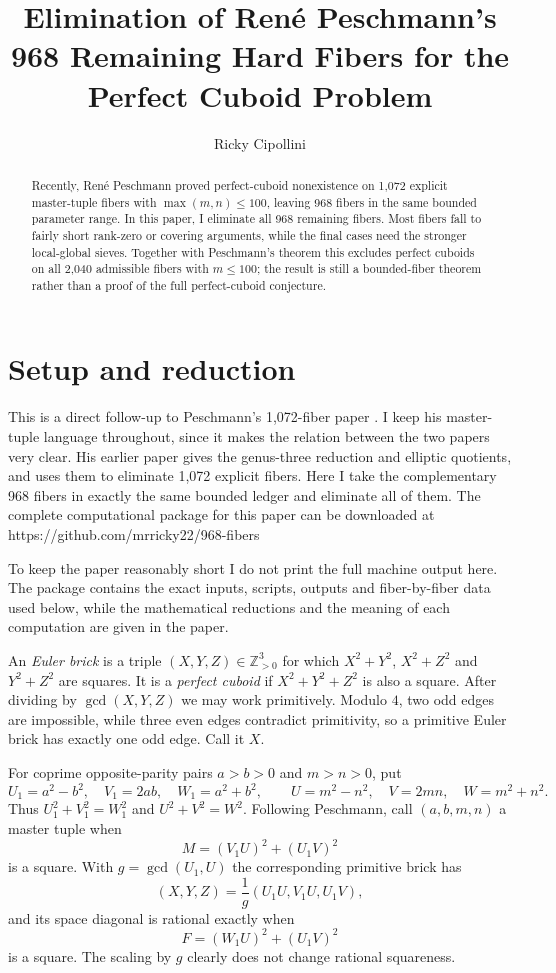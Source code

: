 \documentclass[11pt,a4paper]{amsart}
\title{Elimination of Ren\'e Peschmann's 968 Remaining Hard Fibers for the Perfect Cuboid Problem}
\author{Ricky Cipollini}
\newcommand{\Z}{\mathbb Z}
\begin{document}
\begin{abstract}
Recently, Ren\'e Peschmann proved perfect-cuboid nonexistence on 1,072 explicit master-tuple fibers with $\max(m,n)\le100$, leaving 968 fibers in the same bounded parameter range. In this paper, I eliminate all 968 remaining fibers. Most fibers fall to fairly short rank-zero or covering arguments, while the final cases need the stronger local-global sieves. Together with Peschmann's theorem this excludes perfect cuboids on all 2,040 admissible fibers with $m\le100$; the result is still a bounded-fiber theorem rather than a proof of the full perfect-cuboid conjecture.
\end{abstract}

\maketitle
{}
\section{Setup and reduction}

This is a direct follow-up to Peschmann's 1,072-fiber paper \cite{Pes1072}. I keep his master-tuple language throughout, since it makes the relation between the two papers very clear. His earlier paper \cite{PesQuartic} gives the genus-three reduction and elliptic quotients, and \cite{Pes1072} uses them to eliminate 1,072 explicit fibers. Here I take the complementary 968 fibers in exactly the same bounded ledger and eliminate all of them. The complete computational package for this paper can be downloaded at https://github.com/mrricky22/968-fibers

To keep the paper reasonably short I do not print the full machine output here. The package contains the exact inputs, scripts, outputs and fiber-by-fiber data used below, while the mathematical reductions and the meaning of each computation are given in the paper.

An \emph{Euler brick} is a triple $(X,Y,Z)\in\Z_{>0}^3$ for which $X^2+Y^2$, $X^2+Z^2$ and $Y^2+Z^2$ are squares. It is a \emph{perfect cuboid} if $X^2+Y^2+Z^2$ is also a square. After dividing by $\gcd(X,Y,Z)$ we may work primitively. Modulo $4$, two odd edges are impossible, while three even edges contradict primitivity, so a primitive Euler brick has exactly one odd edge. Call it $X$.

For coprime opposite-parity pairs $a>b>0$ and $m>n>0$, put
\[
U_1=a^2-b^2,\quad V_1=2ab,\quad W_1=a^2+b^2,\qquad
U=m^2-n^2,\quad V=2mn,\quad W=m^2+n^2.
\]
Thus $U_1^2+V_1^2=W_1^2$ and $U^2+V^2=W^2$. Following Peschmann, call $(a,b,m,n)$ a master tuple when
\[
M=(V_1U)^2+(U_1V)^2
\]
is a square. With $g=\gcd(U_1,U)$ the corresponding primitive brick has
\[
(X,Y,Z)=\frac1g(U_1U,V_1U,U_1V),
\]
and its space diagonal is rational exactly when
\[
F=(W_1U)^2+(U_1V)^2
\]
is a square. The scaling by $g$ clearly does not change rational squareness.
\end{document}
